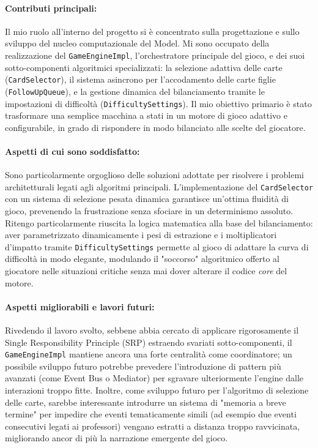 \documentclass[11pt, a4paper, oneside]{report}
\begin{document}
\paragraph{Contributi principali:}
Il mio ruolo all'interno del progetto si è concentrato sulla progettazione e sullo sviluppo del nucleo computazionale del Model. Mi sono occupato della realizzazione del \texttt{GameEngineImpl}, l'orchestratore principale del gioco, e dei suoi sotto-componenti algoritmici specializzati: la selezione adattiva delle carte (\texttt{CardSelector}), il sistema asincrono per l'accodamento delle carte figlie (\texttt{FollowUpQueue}), e la gestione dinamica del bilanciamento tramite le impostazioni di difficoltà (\texttt{DifficultySettings}). Il mio obiettivo primario è stato trasformare una semplice macchina a stati in un motore di gioco adattivo e configurabile, in grado di rispondere in modo bilanciato alle scelte del giocatore.

\paragraph{Aspetti di cui sono soddisfatto:}
Sono particolarmente orgoglioso delle soluzioni adottate per risolvere i problemi architetturali legati agli algoritmi principali. L'implementazione del \texttt{CardSelector} con un sistema di selezione pesata dinamica garantisce un'ottima fluidità di gioco, prevenendo la frustrazione senza sfociare in un determinismo assoluto. Ritengo particolarmente riuscita la logica matematica alla base del bilanciamento: aver parametrizzato dinamicamente i pesi di estrazione e i moltiplicatori d'impatto tramite \texttt{DifficultySettings} permette al gioco di adattare la curva di difficoltà in modo elegante, modulando il "soccorso" algoritmico offerto al giocatore nelle situazioni critiche senza mai dover alterare il codice \textit{core} del motore.

\paragraph{Aspetti migliorabili e lavori futuri:}
Rivedendo il lavoro svolto, sebbene abbia cercato di applicare rigorosamente il Single Responsibility Principle (SRP) estraendo svariati sotto-componenti, il \texttt{GameEngineImpl} mantiene ancora una forte centralità come coordinatore; un possibile sviluppo futuro potrebbe prevedere l'introduzione di pattern più avanzati (come Event Bus o Mediator) per sgravare ulteriormente l'engine dalle interazioni troppo fitte. Inoltre, come sviluppo futuro per l'algoritmo di selezione delle carte, sarebbe interessante introdurre un sistema di "memoria a breve termine" per impedire che eventi tematicamente simili (ad esempio due eventi consecutivi legati ai professori) vengano estratti a distanza troppo ravvicinata, migliorando ancor di più la narrazione emergente del gioco.
\end{document}

